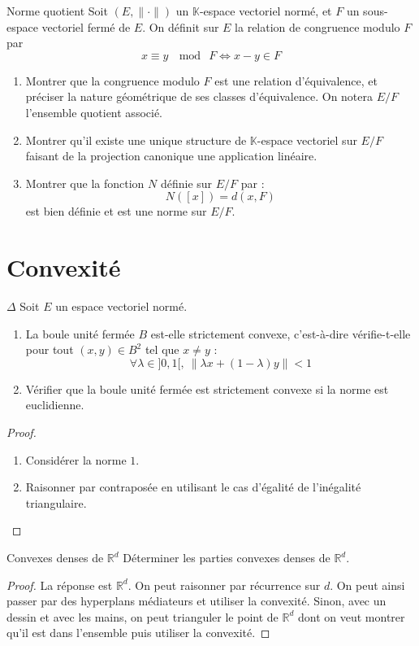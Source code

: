 \documentclass[french,a4paper]{article}
\newcommand{\R}{\mathbb{R}}
\newcommand{\K}{\mathbb{K}}
\theoremstyle{plain}
\theoremstyle{definition}
\theoremstyle{remark}
\begin{document}
\begin{ex}{Norme quotient}
	Soit $(E,\lVert\cdot\rVert)$ un $\K$-espace vectoriel normé, et $F$ un sous-espace vectoriel fermé de $E$. On définit sur $E$ la relation de congruence modulo $F$ par $$x\equiv y\ \mod \ F\iff x-y\in F$$
	\begin{enumerate}
		\item Montrer que la congruence modulo $F$ est une relation d'équivalence, et préciser la nature géométrique de ses classes d'équivalence. On notera $E/F$ l'ensemble quotient associé.
		\item Montrer qu'il existe une unique structure de $\K$-espace vectoriel sur $E/F$ faisant de la projection canonique une application linéaire.
		\item Montrer que la fonction $N$ définie sur $E/F$ par : $$N([x])=d(x,F)$$ est bien définie et est une norme sur $E/F$.
	\end{enumerate}
\end{ex}

\section{Convexité}

\begin{ex}{$\Delta$}
	Soit $E$ un espace vectoriel normé. 
	\begin{enumerate}
		\item La boule unité fermée $B$ est-elle strictement convexe, c'est-à-dire vérifie-t-elle pour tout $(x,y)\in B^2$ tel que $x\ne y$ :
		$$\forall\lambda\in]0,1[,\ \lVert\lambda x+(1-\lambda)y\rVert <1$$
		\item Vérifier que la boule unité fermée est strictement convexe si la norme est euclidienne.
	\end{enumerate}
\end{ex}
\begin{proof}
	\begin{enumerate}
		\item Considérer la norme $1$.
		\item Raisonner par contraposée en utilisant le cas d'égalité de l'inégalité triangulaire.
	\end{enumerate}
\end{proof}

\begin{ex}{Convexes denses de $\R^d$}
	Déterminer les parties convexes denses de $\R^d$.
\end{ex}
\begin{proof}
	La réponse est $\R^d$. On peut raisonner par récurrence sur $d$. On peut ainsi passer par des hyperplans médiateurs et utiliser la convexité. Sinon, avec un dessin et avec les mains, on peut trianguler le point de $\R^d$ dont on veut montrer qu'il est dans l'ensemble puis utiliser la convexité.
\end{proof}
\end{document}
